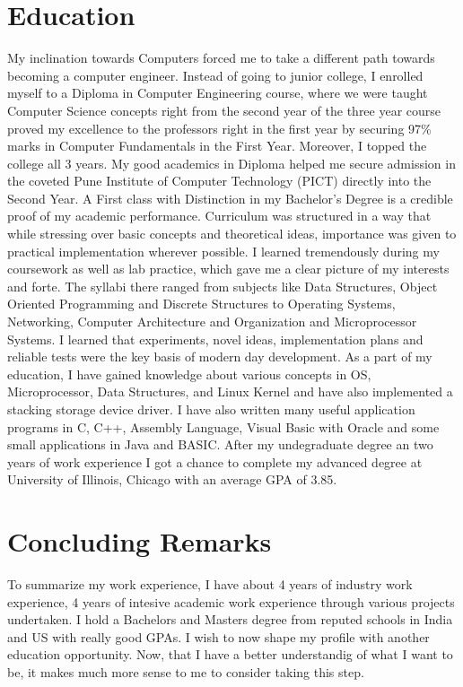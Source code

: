 \documentclass[letterpaper]{article}
\begin{document}
\section*{Education}
My inclination towards Computers forced me to take a different path towards becoming a computer engineer. 
Instead of going to junior college, I enrolled myself to a Diploma in Computer Engineering course, 
where we were taught Computer Science concepts right from the second year of the three year course proved my 
excellence to the professors right in the first year by securing 97\% marks in Computer Fundamentals in 
the First Year. Moreover, I topped the college all 3 years. My good academics in Diploma helped me secure admission 
in the coveted Pune Institute of Computer Technology (PICT) directly into the Second Year. 
A First class with Distinction in my Bachelor's Degree is a credible proof of my academic performance. 
Curriculum was structured in a way that while stressing over basic concepts and theoretical ideas, 
importance was given to practical implementation wherever possible.  
I learned tremendously during my coursework as well as lab practice, which gave me a clear 
picture of my interests and forte. The syllabi there ranged from subjects like Data Structures, 
Object Oriented Programming and Discrete Structures to Operating Systems, Networking, Computer Architecture 
and Organization and Microprocessor Systems. I learned that experiments, novel ideas, implementation plans 
and reliable tests were the key basis of modern day development. As a part of my education, I have gained knowledge about various concepts in OS, 
Microprocessor, Data Structures, and Linux Kernel and have also implemented a stacking storage device driver. 
I have also written many useful application programs in C, C++, Assembly Language, Visual Basic with Oracle and some small applications in Java and BASIC.
After my undegraduate degree an two years of work experience I got a chance to complete my advanced degree at University of Illinois, Chicago with an
average GPA of 3.85.


\section*{Concluding Remarks}
To summarize my work experience, I have about 4 years of industry work experience, 4
years of intesive academic work experience through various projects undertaken. 
I hold a Bachelors and Masters degree from reputed schools in India and US with really good GPAs.
I wish to now shape my profile with another education opportunity. Now, that I have a better
understandig of what I want to be, it makes much more sense to me to consider taking this step.
\end{document}
